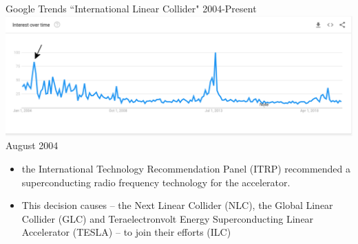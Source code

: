 \documentclass[10pt]{beamer}
\begin{document}
\begin{frame}
Google Trends ``International Linear Collider" 2004-Present
\includegraphics[scale=0.25]{timeline1.png}\\
August 2004 
\begin{itemize}
\scriptsize
\item the International Technology Recommendation Panel (ITRP) recommended a superconducting radio frequency technology for the accelerator. 

\item This decision causes – the Next Linear Collider (NLC), the Global Linear Collider (GLC) and Teraelectronvolt Energy Superconducting Linear Accelerator (TESLA) -- to join their efforts (ILC)
\end{itemize}
\end{frame}
\end{document}
